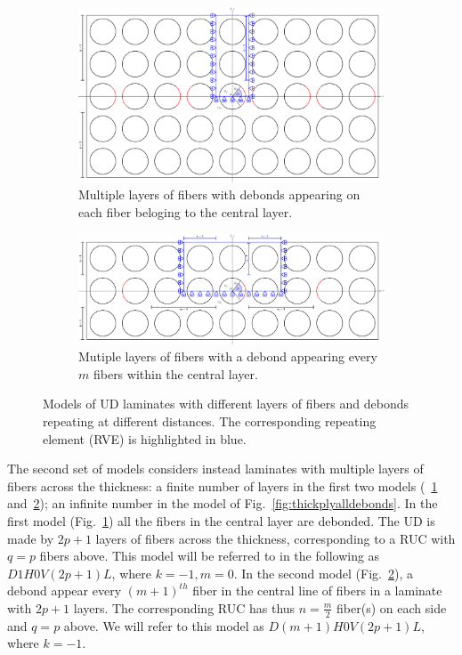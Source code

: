 \documentclass[review]{elsarticle}
\begin{document}
\begin{figure}[!h]
\centering
    \begin{subfigure}[b]{\textwidth}
    \centering
        \includegraphics[height=0.3\textheight]{thickPlycentraldebondsline.pdf}
        \caption{Multiple layers of fibers with debonds appearing on each fiber beloging to the central layer.}\label{subfig:thickplycentraldebonds}
    \end{subfigure} 

    \begin{subfigure}[b]{\textwidth}
        \includegraphics[width=\textwidth]{thickPly.pdf}
        \caption{Mutiple layers of fibers with a debond appearing every $m$ fibers within the central layer.}\label{subfig:thickply}
    \end{subfigure} 

\caption{Models of UD laminates with different layers of fibers and debonds repeating at different distances. The corresponding repeating element (RVE) is highlighted in blue.}\label{fig:laminateModelsB}
\end{figure}

The second set of models considers instead laminates with multiple layers of fibers across the thickness: a finite number of layers in the first two models (~\ref{subfig:thickplycentraldebonds} and~\ref{subfig:thickply}); an infinite number in the model of Fig.~\ref{fig:thickplyalldebonds}. In the first model (Fig.~\ref{subfig:thickplycentraldebonds}) all the fibers in the central layer are debonded. The UD is made by $2p+1$ layers of fibers across the thickness, corresponding to a RUC with $q=p$ fibers above. This model will be referred to in the following as $D1H0V\left(2p+1\right)L$, where $k=-1,m=0$. In the second model (Fig.~\ref{subfig:thickply}), a debond appear every $\left(m+1\right)^{th}$ fiber in the central line of fibers in a laminate with $2p+1$ layers. The corresponding RUC has thus $n=\frac{m}{2}$ fiber(s) on each side and $q=p$ above. We will refer to this model as $D\left(m+1\right)H0V\left(2p+1\right)L$, where $k=-1$.
\end{document}
